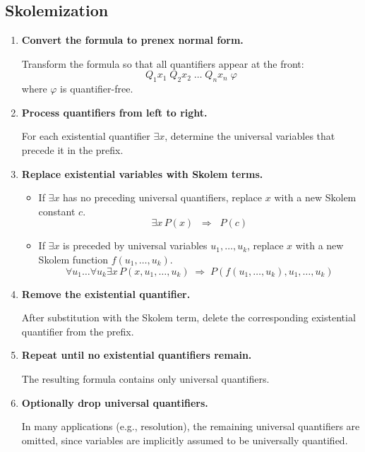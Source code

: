 \documentclass{article}
\begin{document}
\subsection{Skolemization}
\begin{enumerate}
    \item \textbf{Convert the formula to prenex normal form.}

    Transform the formula so that all quantifiers appear at the front:
    \[
    Q_1 x_1 \; Q_2 x_2 \; \dots \; Q_n x_n \; \varphi
    \]
    where \(\varphi\) is quantifier-free.

    \item \textbf{Process quantifiers from left to right.}

    For each existential quantifier \(\exists x\), determine the universal
    variables that precede it in the prefix.

    \item \textbf{Replace existential variables with Skolem terms.}

    \begin{itemize}
        \item If \(\exists x\) has no preceding universal quantifiers,
        replace \(x\) with a new Skolem constant \(c\).
        \[
        \exists x \, P(x) \;\;\Rightarrow\;\; P(c)
        \]

        \item If \(\exists x\) is preceded by universal variables
        \(u_1,\dots,u_k\), replace \(x\) with a new Skolem function
        \(f(u_1,\dots,u_k)\).
        \[
        \forall u_1 \dots \forall u_k \exists x \, P(x,u_1,\dots,u_k)
        \;\Rightarrow\;
        P(f(u_1,\dots,u_k),u_1,\dots,u_k)
        \]
    \end{itemize}

    \item \textbf{Remove the existential quantifier.}

    After substitution with the Skolem term, delete the corresponding
    existential quantifier from the prefix.

    \item \textbf{Repeat until no existential quantifiers remain.}

    The resulting formula contains only universal quantifiers.

    \item \textbf{Optionally drop universal quantifiers.}

    In many applications (e.g., resolution), the remaining universal
    quantifiers are omitted, since variables are implicitly assumed to
    be universally quantified.
\end{enumerate}
\end{document}

